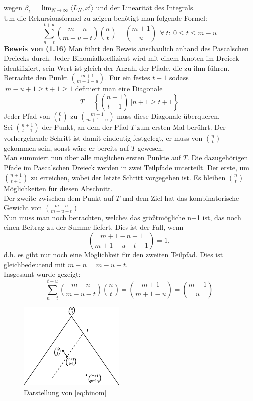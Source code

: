 \documentclass[a4paper, 11pt]{scrreprt}
\begin{document}
wegen $\beta_l = \lim_{N\to\infty} \langle \overline{L_N}, x^l \rangle$ und der Linearität des Integrals.\\

Um die Rekursionsformel zu zeigen benötigt man folgende Formel:
\begin{equation}
\label{eq:binom}
	\sum_{n= t}^{t+u} \binom{m-n}{m-u-t} \binom{n}{t} = \binom{m+1}{u}~~\forall\ t: \ 0\leq t \leq m-u
\end{equation}
\textbf{Beweis von (1.16)}  
Man führt den Beweis anschaulich anhand des Pascalschen Dreiecks durch. Jeder Binomialkoeffizient wird mit einem Knoten im Dreieck identifiziert, sein Wert ist gleich der Anzahl der Pfade, die zu ihm führen. \\
Betrachte den Punkt $ \binom{m+1}{m+1-u} $. Für ein festes $t+1$ sodass $~m-u+1\geq t+1 \geq 1$ definiert man  eine Diagonale \[T=\left\lbrace  \binom{n+1}{t+1}~\vert n+1 \geq t+1 \right\rbrace  \] Jeder Pfad von $ \binom{0}{0} $ zu $ \binom{m+1}{m+1-u} $ muss diese Diagonale überqueren. \\Sei $ \binom{n+1}{t+1} $ der Punkt, an dem der Pfad $ T $ zum ersten Mal berührt. Der vorhergehende Schritt ist damit eindeutig festgelegt, er muss von $ \binom{n}{t} $ gekommen sein, sonst wäre er bereits auf $ T $ gewesen.\\ 
Man summiert nun über alle möglichen ersten Punkte auf $ T $. Die dazugehörigen Pfade im Pascalschen Dreieck werden in zwei Teilpfade unterteilt. Der erste, um $ \binom{n+1}{t+1} $ zu erreichen, wobei der letzte Schritt vorgegeben ist. Es bleiben $ \binom{n}{t} $ Möglichkeiten für diesen Abschnitt.\\
Der zweite zwischen dem Punkt auf $ T $ und dem Ziel hat das kombinatorische Gewicht von $\binom{m-n}{m-u-t}$\\
Nun muss man noch betrachten, welches das größtmögliche n+1 ist, das noch einen Beitrag zu der Summe liefert. Dies ist der Fall, wenn \[ \binom{m+1-n-1}{m+1-u-t-1}=1,  \] d.h. es gibt nur noch eine Möglichkeit für den zweiten Teilpfad. Dies ist gleichbedeutend mit $ m-n=m-u-t $.\\Insgesamt wurde gezeigt:
\[ \sum_{n=t}^{t+u}\binom{m-n}{m-u-t} \binom{n}{t}= \binom{m+1}{m+1-u}=\binom{m+1}{u} \]

\begin{figure}[htpb]
	\centering
	\includegraphics[width=0.45\textwidth]{Parsevalsches-Dreieck.pdf}
	\caption{Darstellung von \ref{eq:binom}}
\end{figure}
\end{document}
